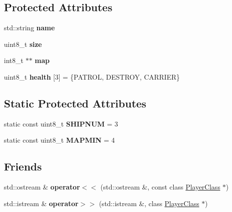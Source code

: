 \subsection*{Protected Attributes}
\begin{DoxyCompactItemize}
\item 
\mbox{\label{class_player_class_abe87e5b9f5bf141fd2a5def5cda30511}} 
std\+::string {\bfseries name}
\item 
\mbox{\label{class_player_class_a9bbc1158845fb8e69a7f84b02117989e}} 
uint8\+\_\+t {\bfseries size}
\item 
\mbox{\label{class_player_class_a4444c07762d4e71c95d4687d2b34303e}} 
int8\+\_\+t $\ast$$\ast$ {\bfseries map}
\item 
\mbox{\label{class_player_class_a92446c5124d2888ea97ca65a34f1a3bb}} 
uint8\+\_\+t {\bfseries health} \mbox{[}3\mbox{]} = \{P\+A\+T\+R\+OL, D\+E\+S\+T\+R\+OY, C\+A\+R\+R\+I\+ER\}
\end{DoxyCompactItemize}
\subsection*{Static Protected Attributes}
\begin{DoxyCompactItemize}
\item 
\mbox{\label{class_player_class_ad9ced08966e2e15f477955d9b2c3b645}} 
static const uint8\+\_\+t {\bfseries S\+H\+I\+P\+N\+UM} = 3
\item 
\mbox{\label{class_player_class_a74fccd841ac9195b821d1b4650fef727}} 
static const uint8\+\_\+t {\bfseries M\+A\+P\+M\+IN} = 4
\end{DoxyCompactItemize}
\subsection*{Friends}
\begin{DoxyCompactItemize}
\item 
\mbox{\label{class_player_class_aa2a4f72b5f2aae268ba01e5e24f17b1d}} 
std\+::ostream \& {\bfseries operator$<$$<$} (std\+::ostream \&, const class \mbox{\hyperlink{class_player_class}{Player\+Class}} $\ast$)
\item 
\mbox{\label{class_player_class_a23f5189071d8e2c7d4f9c6f9a78c5135}} 
std\+::istream \& {\bfseries operator$>$$>$} (std\+::istream \&, class \mbox{\hyperlink{class_player_class}{Player\+Class}} $\ast$)
\end{DoxyCompactItemize}


